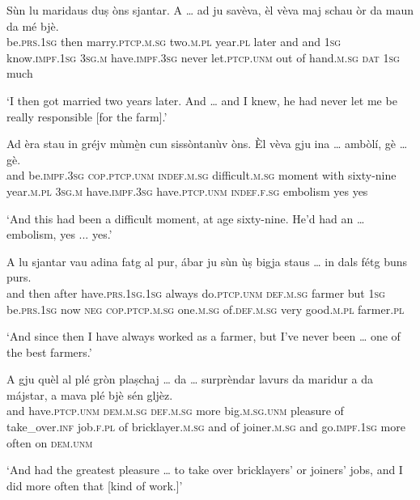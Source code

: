 \begin{linenumbers}
\gll    Sùn lu maridaus duṣ òns sjantar. A … ad ju savèva, èl vèva maj schau òr da maun da mé bjè.\\
be.\textsc{prs.1sg} then marry.\textsc{ptcp.m.sg} two.\textsc{m.pl} year.\textsc{pl} later and {} and \textsc{1sg} know.\textsc{impf.1sg} \textsc{3sg.m} have.\textsc{impf.3sg} never let.\textsc{ptcp.unm} out of hand.\textsc{m.sg} \textsc{dat} \textsc{1sg} much\\
\end{linenumbers}
\medskip
\glt `I then got married two years later. And … and I knew, he had never let me be really responsible [for the farm].'
\medskip

\begin{linenumbers}
\gll    Ad èra stau in gréjv mùmè̱n cun sissòntanùv òns. Èl vèva gju ina … ambòlí, gè … gè.\\
and be.\textsc{impf.3sg} \textsc{cop.ptcp.unm} \textsc{indef.m.sg} difficult.\textsc{m.sg} moment with sixty-nine year.\textsc{m.pl} \textsc{3sg.m} have.\textsc{impf.3sg} have.\textsc{ptcp.unm} \textsc{indef.f.sg} {} embolism yes {} yes\\
\end{linenumbers}
\medskip
\glt `And this had been a difficult moment, at age sixty-nine. He’d had an … embolism, yes ... yes.'
\medskip

\begin{linenumbers}
\gll    A lu sjantar vau adina fatg al pur, ábar ju sùn ùṣ bigja staus … in dals fétg buns purs.\\
and then after have.\textsc{prs.1sg.1sg} always do.\textsc{ptcp.unm} \textsc{def.m.sg} farmer but  \textsc{1sg} be.\textsc{prs.1sg} now \textsc{neg} \textsc{cop.ptcp.m.sg} {} one.\textsc{m.sg} of.\textsc{def.m.sg} very good.\textsc{m.pl} farmer.\textsc{pl}\\
\end{linenumbers}
\medskip
\glt `And since then I have always worked as a farmer, but I’ve never been … one of the best farmers.'
\medskip

\begin{linenumbers}
\gll    A gju quèl al plé gròn plaṣchaj … da … surprèndar lavurs da maridur a da májstar, a mava plé bjè sén gljèz.\\
and have.\textsc{ptcp.unm} \textsc{dem.m.sg} \textsc{def.m.sg} more big.\textsc{m.sg.unm} pleasure {} of {}  take\_over.\textsc{inf} job.\textsc{f.pl} of bricklayer.\textsc{m.sg} and of joiner.\textsc{m.sg} and  go.\textsc{impf.1sg} more often on \textsc{dem.unm}\\
\end{linenumbers}
\medskip
\glt `And had the greatest pleasure … to take over bricklayers’ or joiners’ jobs, and I did more often that [kind of work.]'
\medskip

